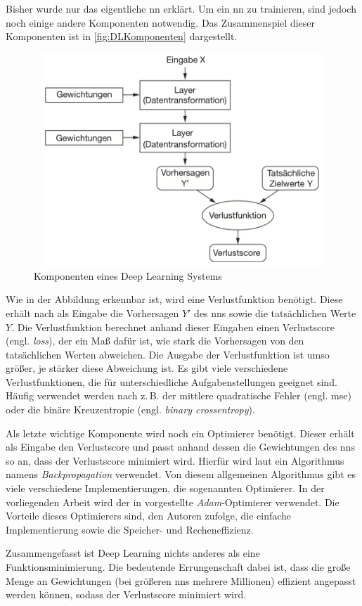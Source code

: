 Bisher wurde nur das eigentliche \acrshort{nn} erklärt.
Um ein \acrshort{nn} zu trainieren, sind jedoch noch einige andere Komponenten notwendig.
Das Zusammenspiel dieser Komponenten ist in \autoref{fig:DLKomponenten} dargestellt.
\begin{figure}[h]
    \centering
    \includegraphics[width=1\textwidth,height=8cm,keepaspectratio=true]{content/images/DeepLearningKomponenten.png}
    \caption{Komponenten eines Deep Learning Systems \cite[Abb. 1.9]{DeepLearningPythonKeras}}
    \label{fig:DLKomponenten}
\end{figure}
Wie in der Abbildung erkennbar ist, wird eine Verlustfunktion benötigt.
Diese erhält nach \cite[S. 30]{DeepLearningPythonKeras} als Eingabe die Vorhersagen $Y'$ des \acrshort{nn}s sowie die tatsächlichen Werte $Y$.
Die Verlustfunktion berechnet anhand dieser Eingaben einen Verlustscore (engl. \emph{loss}), der ein Maß dafür ist, wie stark die Vorhersagen von den tatsächlichen Werten abweichen.
Die Ausgabe der Verlustfunktion ist umso größer, je stärker diese Abweichung ist.
Es gibt viele verschiedene Verlustfunktionen, die für unterschiedliche Aufgabenstellungen geeignet sind.
Häufig verwendet werden nach \cite[S. 155]{DeepLearningPythonKeras} z.\,B. der mittlere quadratische Fehler (engl. \acrfull{mse}) oder die binäre Kreuzentropie (engl. \emph{binary crossentropy}).

Als letzte wichtige Komponente wird noch ein Optimierer benötigt.
Dieser erhält als Eingabe den Verlustscore und passt anhand dessen die Gewichtungen des \acrshort{nn}s so an, dass der Verlustscore minimiert wird.
Hierfür wird laut \cite[S. 30]{DeepLearningPythonKeras} ein Algorithmus namens \emph{Backpropagation} verwendet.
Von diesem allgemeinen Algorithmus gibt es viele verschiedene Implementierungen, die sogenannten Optimierer.
In der vorliegenden Arbeit wird der in \cite{AdamPaper} vorgestellte \emph{Adam}-Optimierer verwendet.
Die Vorteile dieses Optimierers sind, den Autoren zufolge, die einfache Implementierung sowie die Speicher- und Recheneffizienz.

Zusammengefasst ist Deep Learning nichts anderes als eine Funktionsminimierung.
Die bedeutende Errungenschaft dabei ist, dass die große Menge an Gewichtungen (bei größeren \acrshort{nn}s mehrere Millionen) effizient angepasst werden können, sodass der Verlustscore minimiert wird.

